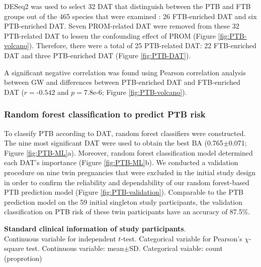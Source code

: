 \documentclass[11pt, a4paper, onecolumn, oneside]{report}
\begin{document}
                DESeq2 was used to select 32 DAT that distinguish between the PTB and FTB groups out of the 465 species that were examined \cite{DESeq2-1}: 26 FTB-enriched DAT and six PTB-enriched DAT. Seven PROM-related DAT were removed from these 32 PTB-related DAT to lessen the confounding effect of PROM (Figure \ref{fig:PTB-volcano}). Therefore, there were a total of 25 PTB-related DAT: 22 FTB-enriched DAT and three PTB-enriched DAT (Figure \ref{fig:PTB-DAT}).

                A significant negative correlation was found using Pearson correlation analysis between GW and differences between PTB-enriched DAT and FTB-enriched DAT ($r = \textrm{-}0.542$ and $p = 7.8\textrm{e-}6$; Figure \ref{fig:PTB-volcano}).

            \subsubsection{Random forest classification to predict PTB risk}
                To classify PTB according to DAT, random forest classifiers were constructed. The nine most significant DAT were used to obtain the best BA (0.765$\pm$0.071; Figure \ref{fig:PTB-ML}a). Moreover, random forest classification model determined each DAT's importance (Figure \ref{fig:PTB-ML}b). We conducted a validation procedure on nine twin pregnancies that were excluded in the initial study design in order to confirm the reliability and dependability of our random forest-based PTB prediction model (Figure \ref{fig:PTB-validation}). Comparable to the PTB prediction model on the 59 initial singleton study participants, the validation classification on PTB risk of these twin participants have an accuracy of 87.5\%.

            \begin{table}[p]
                \centering
                \caption[Standard clinical information of study participants]{\textbf{Standard clinical information of study participants}. \\
                    Continuous variable for independent $t$-test. Categorical variable for Pearson's $\chi$-square test. Continuous variable: mean$\pm$SD. Categorical vaiable: count (proprotion)}
                    
                \label{tab:PTB-clinical}
            \end{table}
            \clearpage
\end{document}

